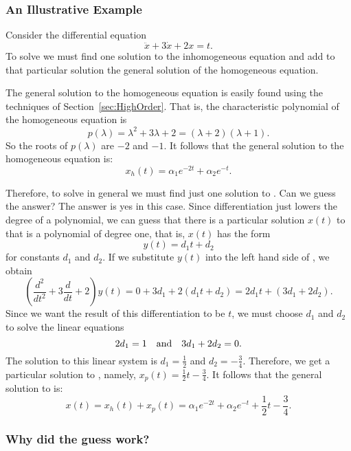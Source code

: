 \documentclass{ximera}
\begin{document}
\subsubsection*{An Illustrative Example}

Consider the differential equation
\begin{equation}  \label{eq:undetcoeffex}
\ddot{x} + 3\dot{x}+2x = t.
\end{equation}
To solve  we must find one solution to the inhomogeneous
equation and add to that particular solution the 
general solution of the 
homogeneous equation.  

The general solution to the homogeneous equation is easily found using the
techniques of Section~\ref{sec:HighOrder}.  That is, the characteristic 
polynomial of the homogeneous equation is 
\[
p(\lambda) = \lambda^2 + 3\lambda + 2 = (\lambda+2)(\lambda+1).
\]
So the roots of $p(\lambda)$ are $-2$ and $-1$.  It follows that the general
solution to the homogeneous equation is:
\[
x_h(t)= \alpha_1e^{-2t} + \alpha_2e^{-t}.
\]

Therefore, to solve  in general we must find just one 
solution to .  Can we guess the answer?  The answer is
yes in this case.  Since differentiation just lowers the degree of a 
polynomial, we can guess that there is a particular solution $x(t)$ to 
 that is a polynomial of degree one, that is, $x(t)$ 
has the form 
\[
y(t)=d_1t+d_2
\]
for constants $d_1$ and $d_2$.  If we substitute $y(t)$ 
into the left hand side of , we obtain
\[
\left(\frac{d^2}{dt^2}+3\frac{d}{dt}+2\right)y(t) = 
0+3d_1+2(d_1t+d_2) = 2d_1t + (3d_1+2d_2).
\]
Since we want the result of this differentiation to be $t$, we must choose 
$d_1$ and $d_2$ to solve the linear equations
\[
2d_1 = 1 \quad\mbox{and}\quad 3d_1+2d_2=0.
\]
The solution to this linear system is $d_1=\frac{1}{2}$ and 
$d_2=-\frac{3}{4}$.   Therefore, we get a 
particular solution to 
, namely, $x_p(t)=\frac{1}{2}t-\frac{3}{4}$.  
It follows that the general solution to  is:
\[
x(t) = x_h(t)+x_p(t) = \alpha_1e^{-2t} + \alpha_2e^{-t} + 
\frac{1}{2}t-\frac{3}{4}.
\]

\subsubsection*{Why did the guess work?}
\end{document}
